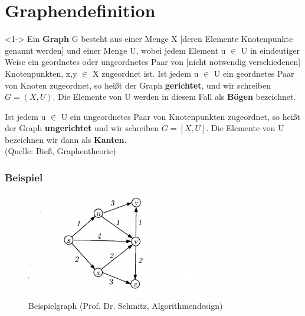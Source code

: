 \section{Graphendefinition}

\begin{frame}
	\begin{block}<1->{}
				Ein \textbf{Graph} G besteht aus einer Menge X [deren Elemente Knotenpunkte genannt werden] und einer Menge U, wobei jedem Element u $\in$ U in eindeutiger Weise ein geordnetes oder ungeordnetes Paar von [nicht notwendig verschiedenen] Knotenpunkten, x,y $\in$ X zugeordnet ist.
				Ist jedem u $\in$ U ein geordnetes Paar von Knoten zugeordnet, so heißt der Graph \textbf{gerichtet}, und wir schreiben 
				$G= (X, U)$.
				Die Elemente von U werden in diesem Fall als \textbf{Bögen} bezeichnet.

				Ist jedem u $\in$ U ein ungeordnetes Paar von Knotenpunkten zugeordnet, so heißt der Graph \textbf{ungerichtet} und wir schreiben 
				$G=[X,U]$. 
				Die Elemente von U bezeichnen wir dann als \textbf{Kanten.} \\
				\tiny (Quelle: Bieß, Graphentheorie)
	\end{block}
\end{frame}

\begin{frame}
	\frametitle{Beispiel}
	\begin{figure}[h]
		\centering
		\includegraphics[width = 8cm]{./pictures/00_Graph.jpg}
		\caption{Beispielgraph (Prof. Dr. Schmitz, Algorithmendesign)}
	\end{figure}
\end{frame}
	